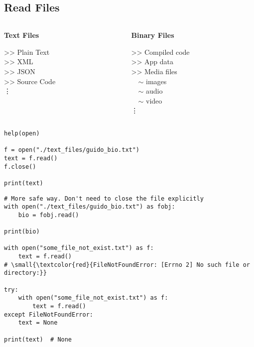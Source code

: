 \documentclass{beamer}
\begin{document}
\subsection{Read Files}

\begin{frame}[fragile]{}
\begin{columns}[t]
\hspace{2cm}
\begin{column}{.3\textwidth}
\textbf{\LARGE{Text Files}}\par \vspace{5pt}
>> Plain Text\\
>> XML\\
>> JSON\\
>> Source Code\\
\vdots
\end{column}
\begin{column}{.5\textwidth}
\textbf{\LARGE{Binary Files}}\par \vspace{5pt}
>> Compiled code\\
>> App data\\
>> Media files\\
\ \ $\sim$ images\\
\ \ $\sim$ audio\\
\ \ $\sim$ video\\
\vdots
\end{column}
\end{columns}
\begin{verbatim}
help(open)

f = open("./text_files/guido_bio.txt")
text = f.read()
f.close()

print(text)
\end{verbatim}
\end{frame}

\begin{frame}[fragile]{}
\begin{verbatim}
# More safe way. Don't need to close the file explicitly
with open("./text_files/guido_bio.txt") as fobj:
    bio = fobj.read()

print(bio)

with open("some_file_not_exist.txt") as f:
    text = f.read()
# \small{\textcolor{red}{FileNotFoundError: [Errno 2] No such file or directory:}}

try:
    with open("some_file_not_exist.txt") as f:
        text = f.read()
except FileNotFoundError:
    text = None

print(text)  # None
\end{verbatim}
\end{frame}
\end{document}
